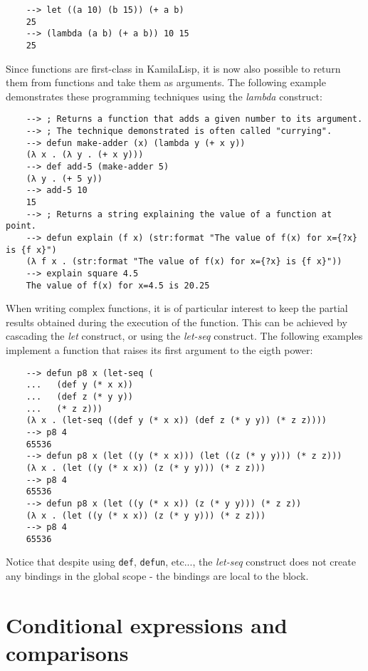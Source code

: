 \begin{Verbatim}
    --> let ((a 10) (b 15)) (+ a b)
    25
    --> (lambda (a b) (+ a b)) 10 15
    25
\end{Verbatim}

Since functions are first-class in KamilaLisp, it is now also possible to return them from functions and take them as arguments. The following example demonstrates these programming techniques using the \textit{lambda} construct:

\begin{Verbatim}
    --> ; Returns a function that adds a given number to its argument.
    --> ; The technique demonstrated is often called "currying".
    --> defun make-adder (x) (lambda y (+ x y))
    (λ x . (λ y . (+ x y)))
    --> def add-5 (make-adder 5)
    (λ y . (+ 5 y))
    --> add-5 10
    15
    --> ; Returns a string explaining the value of a function at point.
    --> defun explain (f x) (str:format "The value of f(x) for x={?x} is {f x}")
    (λ f x . (str:format "The value of f(x) for x={?x} is {f x}"))
    --> explain square 4.5
    The value of f(x) for x=4.5 is 20.25
\end{Verbatim}

When writing complex functions, it is of particular interest to keep the partial results obtained during the execution of the function. This can be achieved by cascading the \textit{let} construct, or using the \textit{let-seq} construct. The following examples implement a function that raises its first argument to the eigth power:

\begin{Verbatim}
    --> defun p8 x (let-seq (
    ...   (def y (* x x))
    ...   (def z (* y y))
    ...   (* z z)))
    (λ x . (let-seq ((def y (* x x)) (def z (* y y)) (* z z))))
    --> p8 4
    65536
    --> defun p8 x (let ((y (* x x))) (let ((z (* y y))) (* z z)))
    (λ x . (let ((y (* x x)) (z (* y y))) (* z z)))
    --> p8 4
    65536
    --> defun p8 x (let ((y (* x x)) (z (* y y))) (* z z))
    (λ x . (let ((y (* x x)) (z (* y y))) (* z z)))
    --> p8 4
    65536
\end{Verbatim}

Notice that despite using \verb|def|, \verb|defun|, etc..., the \textit{let-seq} construct does not create any bindings in the global scope - the bindings are local to the block.

\section{Conditional expressions and comparisons}

